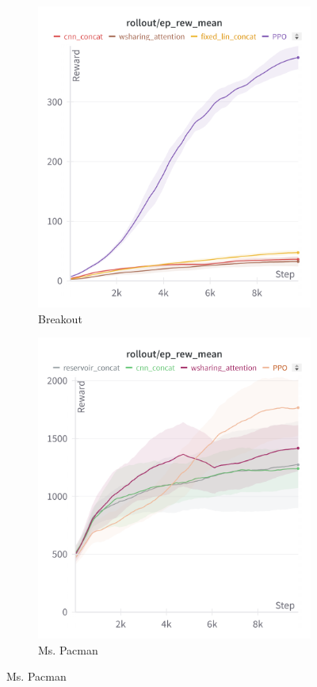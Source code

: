 \begin{figure}[htbp]
\begin{subfigure}[b]{0.32\textwidth}
        \includegraphics[width=\textwidth]{images/breakout_train.png}
        \caption{Breakout}
        \label{fig:asteroidstrain}
    \end{subfigure}
    \hfill
    \begin{subfigure}[b]{0.32\textwidth}
        \centering
        \includegraphics[width=\textwidth]{images/mspacman_train.png}
        \caption{Ms. Pacman}
        \label{fig:mspacmantrain}
    \end{subfigure}


\end{figure}
